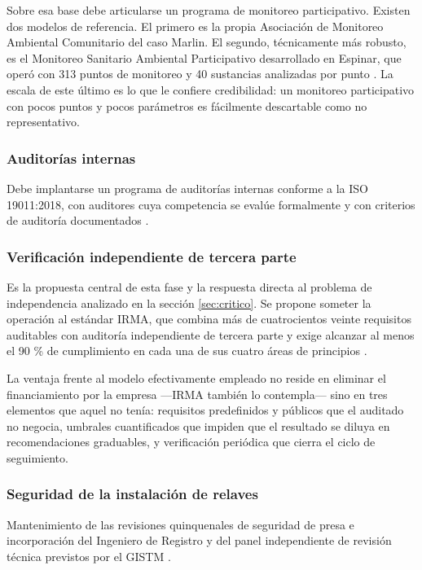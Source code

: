 Sobre esa base debe articularse un programa de monitoreo participativo. Existen
dos modelos de referencia. El primero es la propia Asociación de Monitoreo
Ambiental Comunitario del caso Marlin. El segundo, técnicamente más robusto, es el
Monitoreo Sanitario Ambiental Participativo desarrollado en Espinar, que operó con
313 puntos de monitoreo y 40 sustancias analizadas por punto
\parencite{minam2013espinar}. La escala de este último es lo que le confiere
credibilidad: un monitoreo participativo con pocos puntos y pocos parámetros es
fácilmente descartable como no representativo.

\subsubsection{Auditorías internas}

Debe implantarse un programa de auditorías internas conforme a la
ISO 19011:2018, con auditores cuya competencia se evalúe formalmente y con
criterios de auditoría documentados \parencite{iso2018iso19011}.

\subsubsection{Verificación independiente de tercera parte}

Es la propuesta central de esta fase y la respuesta directa al problema de
independencia analizado en la sección \ref{sec:critico}. Se propone someter la
operación al estándar IRMA, que combina más de cuatrocientos veinte requisitos
auditables con auditoría independiente de tercera parte y exige alcanzar al menos
el 90 \% de cumplimiento en cada una de sus cuatro áreas de principios
\parencite{irmasfstandard}.

La ventaja frente al modelo efectivamente empleado no reside en eliminar el
financiamiento por la empresa —IRMA también lo contempla— sino en tres elementos
que aquel no tenía: requisitos predefinidos y públicos que el auditado no negocia,
umbrales cuantificados que impiden que el resultado se diluya en recomendaciones
graduables, y verificación periódica que cierra el ciclo de seguimiento.

\subsubsection{Seguridad de la instalación de relaves}

Mantenimiento de las revisiones quinquenales de seguridad de presa e incorporación
del Ingeniero de Registro y del panel independiente de revisión técnica previstos
por el GISTM \parencite{icmm2020gistm}.

